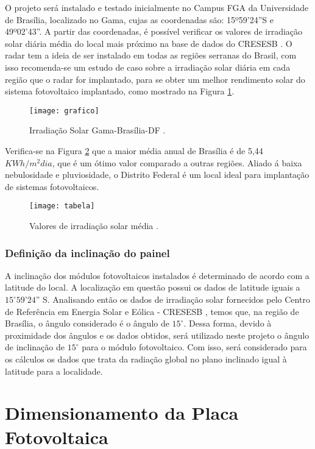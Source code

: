 O projeto será instalado e testado inicialmente no Campus FGA da Universidade de Brasília, localizado no Gama, cujas as coordenadas são: 15º59’24”S e 49º02’43”. A partir das coordenadas, é possível verificar os valores de irradiação solar diária média do local mais próximo na base de dados do CRESESB \cite{solar}.
O radar tem a ideia de ser instalado em todas as regiões serranas do Brasil, com isso recomenda-se um estudo de caso sobre a irradiação solar diária em cada região que o radar for implantado, para se obter um melhor rendimento solar do sistema fotovoltaico implantado, como mostrado na Figura \ref{fig:grafico}. 
\begin{figure}[h!]
\centering
\texttt{[image: grafico]}
\caption{Irradiação Solar Gama-Brasília-DF \cite{solar}.}
\label{fig:grafico}
\end{figure}

Verifica-se na Figura \ref{fig:tabela} que a maior média anual de Brasília é de 5,44 $KWh/m^2dia$, que é um ótimo valor comparado a outras regiões. Aliado á baixa nebulosidade e pluviosidade, o Distrito Federal é um local ideal para implantação de sistemas fotovoltaicos.

\begin{figure}[h!]
\centering
\texttt{[image: tabela]}
\caption{Valores de irradiação solar média \cite{solar}.}
\label{fig:tabela}
\end{figure}


\subsubsection{Definição da inclinação do painel}

 A inclinação dos módulos fotovoltaicos instalados é determinado de acordo com a latitude do local. A localização em questão possui os dados de latitude iguais a $15^{\circ}59’24”$ S. Analisando então os dados de irradiação solar fornecidos pelo Centro de Referência em Energia Solar e Eólica - CRESESB \cite{solar}, temos que, na região de Brasília, o ângulo considerado é o ângulo de $15^{\circ}$. Dessa forma, devido à proximidade dos ângulos e os dados obtidos, será utilizado neste projeto o ângulo de inclinação de $15^{\circ}$ para o módulo fotovoltaico.
 Com isso, será considerado para os  cálculos os dados que  trata da radiação global no plano inclinado  igual à latitude para a localidade.
 
\section{Dimensionamento da Placa Fotovoltaica}

